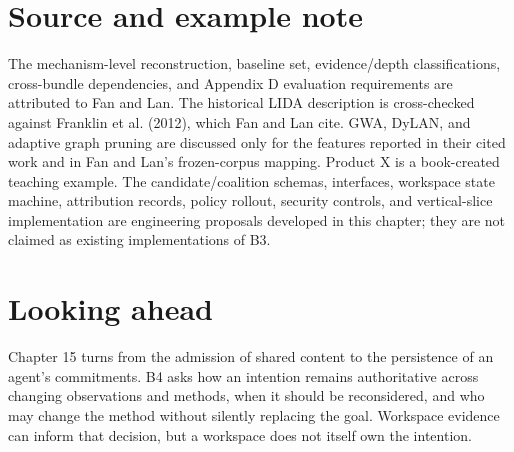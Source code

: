 \section*{Source and example note}

The mechanism-level reconstruction, baseline set, evidence/depth classifications, cross-bundle dependencies, and Appendix D evaluation requirements are attributed to Fan and Lan. The historical LIDA description is cross-checked against Franklin et al. (2012), which Fan and Lan cite. GWA, DyLAN, and adaptive graph pruning are discussed only for the features reported in their cited work and in Fan and Lan's frozen-corpus mapping. Product X is a book-created teaching example. The candidate/coalition schemas, interfaces, workspace state machine, attribution records, policy rollout, security controls, and vertical-slice implementation are engineering proposals developed in this chapter; they are not claimed as existing implementations of B3.

\autocite{franklin2012lida,shang2026theaterofmind,liu2024dylan,li2025adaptivegraphpruning}

\section*{Looking ahead}

Chapter 15 turns from the admission of shared content to the persistence of an agent's commitments. B4 asks how an intention remains authoritative across changing observations and methods, when it should be reconsidered, and who may change the method without silently replacing the goal. Workspace evidence can inform that decision, but a workspace does not itself own the intention.

